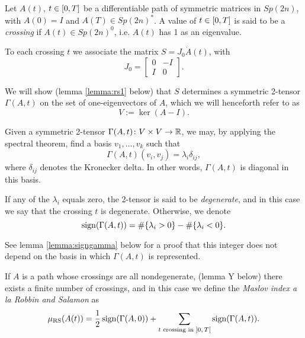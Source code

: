 \begin{definition}\label{def:murs}
Let $A(t)$, $t \in \interval0T$ be a differentiable path of symmetric matrices in $Sp(2n)$, with $A(0) = I$ and $A(T) \in Sp(2n)^*$. A value of $t \in \interval0T$ is said to be a \emph{crossing} if  $A(t) \in Sp(2n)^0$, i.e. $A(t)$ has 1 as an eigenvalue.

To each crossing $t$ we associate the matrix $S = J_0 \dot A(t)$, with
\begin{equation}
J_0 = \begin{bmatrix} 0 & -I \\ I & 0 \end{bmatrix}.
\end{equation}

We will show (lemma \ref{lemma:rs1} below) that $S$ determines a symmetric 2-tensor $\Gamma(A,t)$ on the set of one-eigenvectors of $A$, which we will henceforth refer to as
\begin{equation}
V := \ker(A - I).
\end{equation}

Given a symmetric 2-tensor $\Gamma(A,t) \colon V \times V \to \mathbb{R}$, we may, by applying the spectral theorem, find a basis $v_1, \dots, v_k$ such that
\begin{equation}
\Gamma(A,t)(v_i, v_j) = \lambda_i \delta_{ij},
\end{equation}
where $\delta_{ij}$ denotes the Kronecker delta. In other words, $\Gamma(A,t)$ is diagonal in this basis.

If any of the $\lambda_i$ equals zero, the 2-tensor is said to be \emph{degenerate}, and in this case we say that the crossing $t$ is degenerate. Otherwise, we denote
\begin{equation}
\operatorname{sign}(\Gamma(A,t)) = \#\{\lambda_i > 0\} - \#\{\lambda_i < 0\}.
\end{equation}

See lemma \ref{lemma:signgamma} below for a proof that this integer does not depend on the basis in which $\Gamma(A,t)$ is represented.

If $A$ is a path whose crossings are all nondegenerate, (lemma Y below) there exists a finite number of crossings, and in this case we define the \emph{Maslov index \textit{a la} Robbin and Salamon} as
\begin{equation}\label{eq:mursdef}
\murs(A(t)) = \frac12 \sign(\Gamma(A,0)) + \sum_{\text{$t$ crossing in $\ointerval0T$}} \sign(\Gamma(A,t)).
\end{equation}
\end{definition}

